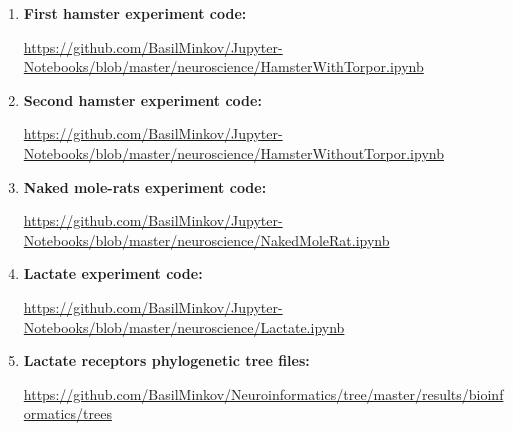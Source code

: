 \documentclass[14pt,a4paper]{scrartcl}
\begin{document}
\begin{enumerate}
  \item \textbf{First hamster experiment code:} 

  \url{https://github.com/BasilMinkov/Jupyter-Notebooks/blob/master/neuroscience/HamsterWithTorpor.ipynb}

  \item \textbf{Second hamster experiment code:} 

  \url{https://github.com/BasilMinkov/Jupyter-Notebooks/blob/master/neuroscience/HamsterWithoutTorpor.ipynb}

  \item \textbf{Naked mole-rats experiment code:} 

  \url{https://github.com/BasilMinkov/Jupyter-Notebooks/blob/master/neuroscience/NakedMoleRat.ipynb}

  \item \textbf{Lactate experiment code:} 

  \url{https://github.com/BasilMinkov/Jupyter-Notebooks/blob/master/neuroscience/Lactate.ipynb}

  \item \textbf{Lactate receptors phylogenetic tree files:} 

  \url{https://github.com/BasilMinkov/Neuroinformatics/tree/master/results/bioinformatics/trees}

\end{enumerate}

\newpage


\end{document}
